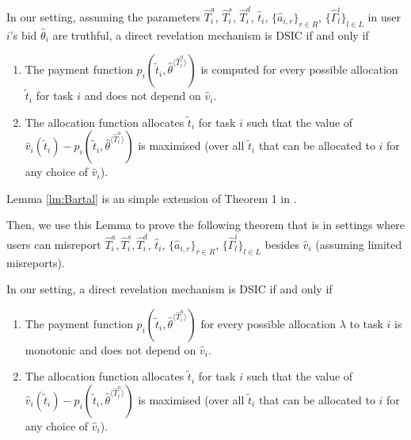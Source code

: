 \documentclass[11pt]{phdthesis}
\begin{document}
\begin{lemma}\label{lm:Bartal}
    In our setting, assuming the parameters $\hat{T}_i^a$, $\hat{T}_i^s$, $\hat{T}_i^d$, $ \hat{t}_i $, $ \{ \hat{a}_{i,r} \}_{r \in R} $, $ \{ \hat{\Gamma}_l^i \}_{l \in L} $ in user $ i $'s bid $ \hat{\theta}_i $ are truthful, a direct revelation mechanism is DSIC if and only if
    
    \begin{enumerate}
        \item The payment function $p_i(\tilde{t}_i, \hat{\theta}^{\langle \hat{T}_i^a \rangle})
        $ is computed for every possible allocation $ \tilde{t}_i $ for task $i$ and does not depend on $\hat{v}_i$.
        \item The allocation function allocates $\tilde{t}_i$ for task $i$ such that the value of $\hat{v}_i( \tilde{t}_i)-p_i(\tilde{t}_i, \hat{\theta}^{\langle \hat{T}_i^a \rangle}) $ is maximised (over all $\tilde{t}_i$ that can be allocated to $i$ for any choice of $\hat{v}_i$).
    \end{enumerate}
\end{lemma}

Lemma \ref{lm:Bartal} is an simple extension of Theorem 1 in \citep{bartal2003incentive}. 

Then, we use this Lemma to prove the following theorem that is in settings where users can misreport $ \hat{T}_i^a,\hat{T}_i^s,\hat{T}_i^d $, $ \hat{t}_i $, $ \{ \hat{a}_{i,r} \}_{r \in R} $, $ \{ \hat{\Gamma}_l^i \}_{l \in L} $ besides $\hat{v}_i$ (assuming limited misreports).

\begin{theorem} \label{th: DSIC}
    In our setting, a direct revelation mechanism is DSIC if and only if
    \begin{enumerate}
        \item The payment function $p_i(\tilde{t}_i, \hat{\theta}^{\langle \hat{T}_i^a \rangle}) $ for every possible allocation $ \lambda $ to task $i$ is monotonic and does not depend on $\hat{v}_i$.
        \item The allocation function allocates $ \tilde{t}_i  $ for task $i$ such that the value of $\hat{v}_i( \tilde{t}_i)-p_i(\tilde{t}_i, \hat{\theta}^{\langle \hat{T}_i^a \rangle}) $ is maximised (over all $ \tilde{t}_i$ that can be allocated to $i$ for any choice of $\hat{v}_i$).
    \end{enumerate}
\end{theorem}
\end{document}
